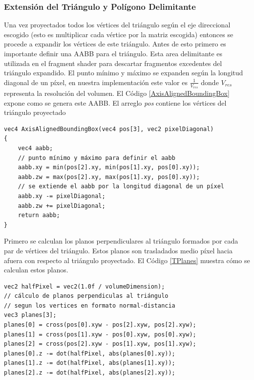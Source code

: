 \subsubsection{Extensión del Triángulo y Polígono Delimitante}
Una vez proyectados todos los vértices del triángulo según el eje direccional escogido (esto es multiplicar cada vértice por la matriz escogida) entonces se procede a expandir los vértices de este triángulo. Antes de esto primero es importante definir una \ac{AABB} para el triángulo. Esta area delimitante es utilizada en el fragment shader para descartar fragmentos excedentes del triángulo expandido. El punto mínimo y máximo se expanden según la longitud diagonal de un píxel, en nuestra implementación este valor es $\frac{1}{V_{res}}$ donde $V_{res}$ representa la resolución del volumen. El Código \ref{AxisAlignedBoundingBox} expone como se genera este \ac{AABB}.  El arreglo \emph{pos} contiene los vértices del triángulo proyectado
\\
\begin{lstlisting}[caption={Creación de un \ac{AABB} para el triángulo proyectado.}, label=AxisAlignedBoundingBox]
vec4 AxisAlignedBoundingBox(vec4 pos[3], vec2 pixelDiagonal)
{
    vec4 aabb;
    // punto mínimo y máximo para definir el aabb
    aabb.xy = min(pos[2].xy, min(pos[1].xy, pos[0].xy));
    aabb.zw = max(pos[2].xy, max(pos[1].xy, pos[0].xy));
    // se extiende el aabb por la longitud diagonal de un píxel
    aabb.xy -= pixelDiagonal;
    aabb.zw += pixelDiagonal;
    return aabb;
}
\end{lstlisting}

Primero se calculan los planos perpendiculares al triángulo formados por cada par de vértices del triángulo. Estos planos son trasladados medio píxel hacia afuera con respecto al triángulo proyectado. El Código \ref{TPlanes} muestra cómo se calculan estos planos.
\\
\begin{lstlisting}[caption={Planos por cada par de vértices del triángulo proyectado.}, label=TPlanes]
vec2 halfPixel = vec2(1.0f / volumeDimension);
// cálculo de planos perpendiculas al triángulo
// segun los vertices en formato normal-distancia
vec3 planes[3];
planes[0] = cross(pos[0].xyw - pos[2].xyw, pos[2].xyw);
planes[1] = cross(pos[1].xyw - pos[0].xyw, pos[0].xyw);
planes[2] = cross(pos[2].xyw - pos[1].xyw, pos[1].xyw);
planes[0].z -= dot(halfPixel, abs(planes[0].xy));
planes[1].z -= dot(halfPixel, abs(planes[1].xy));
planes[2].z -= dot(halfPixel, abs(planes[2].xy));
\end{lstlisting}

